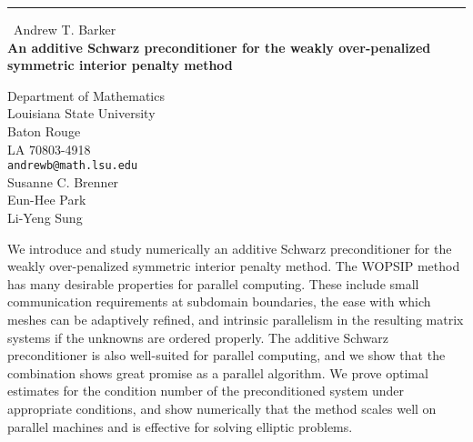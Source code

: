 \documentclass{report}
\begin{document}
\begin{center}
\rule{6in}{1pt} \
{\large Andrew T. Barker \\
{\bf An additive Schwarz preconditioner for the weakly over-penalized symmetric interior penalty method}}

Department of Mathematics \\ Louisiana State University \\ Baton Rouge \\ LA 70803-4918
\\
{\tt andrewb@math.lsu.edu}\\
Susanne C. Brenner\\
Eun-Hee Park\\
Li-Yeng Sung\end{center}

We introduce and study numerically an additive Schwarz preconditioner for
the weakly over-penalized symmetric interior penalty method. The WOPSIP
method has many desirable properties for parallel computing. These
include small communication requirements at subdomain boundaries, the
ease with which meshes can be adaptively refined, and intrinsic
parallelism in the resulting matrix systems if the unknowns are ordered
properly. The additive Schwarz preconditioner is also well-suited for
parallel computing, and we show that the combination shows great promise
as a parallel algorithm. We prove optimal estimates for the condition
number of the preconditioned system under appropriate conditions, and
show numerically that the method scales
well on parallel machines and is effective for solving elliptic problems.
\end{document}
